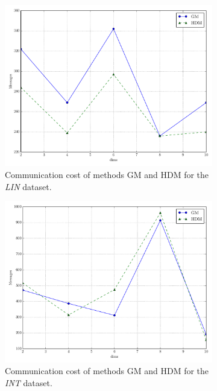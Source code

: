 \begin{figure}[!htb]
\begin{subfigure}{0.32\textwidth}
  \includegraphics[width=\linewidth]{img/main_msg_linear_dims.pdf}
  \caption{Communication cost of methods GM and HDM for the \emph{LIN} dataset.}
\end{subfigure}\hfill
\begin{subfigure}{0.32\textwidth}
  \includegraphics[width=\linewidth]{img/main_msg_interweaving_dims.pdf}
  \caption{Communication cost of methods GM and HDM for the \emph{INT} dataset.}
\end{subfigure}\hfill
\begin{subfigure}{0.32\textwidth}%

\end{subfigure}
\end{figure}
